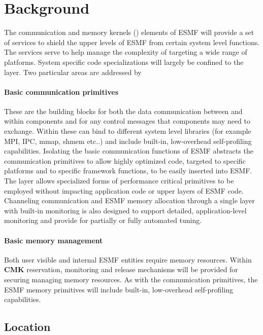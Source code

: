 
\section{Background}

The communication and memory kernels ({\bf \shortname}) elements of ESMF 
will provide a set of services to shield the upper levels of ESMF from certain
system level functions. The {\bf \shortname} services serve to help
manage the complexity of targeting a wide range of platforms.
System specific code specializations will largely be confined 
to the {\bf \shortname} layer.
Two particular areas are addressed by {\bf \shortname}

\paragraph {\bf Basic communication primitives} These are the building blocks for 
both the data communication between and within components and for any
control messages that components may need to exchange. Within {\bf \shortname}
these can bind to different system level libraries
(for example MPI, IPC, mmap, shmem etc..) and include built-in,
low-overhead self-profiling capabilities.
Isolating the basic communication functions of ESMF
abstracts the communication primitives to allow highly optimized code,
targeted to specific platforms and to specific framework functions,
to be easily inserted into ESMF. The {\bf \shortname}
layer allows specialized forms of performance critical
primitives to be employed without impacting application
code or upper layers of ESMF code.
Channeling communication and ESMF memory allocation through a single
layer with built-in monitoring
is also designed to support detailed, application-level monitoring and
provide for partially or fully automated tuning.


\paragraph {\bf Basic memory management} Both user visible and internal
ESMF entities require memory resources. Within {\bf CMK} reservation,
 monitoring and release mechanisms will be provided for securing managing
memory resources. As with the communication primitives, the
ESMF memory primitives will include built-in, low-overhead self-profiling 
capabilities.


\subsection{Location}

